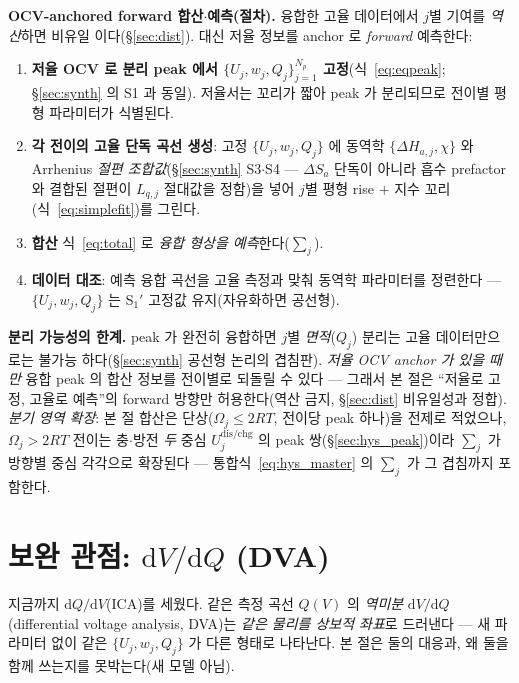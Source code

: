 \documentclass[11pt,a4paper]{article}
\newcommand{\dd}{\mathrm{d}}
\newcommand{\dis}{\mathrm{dis}}
\newcommand{\chg}{\mathrm{chg}}
\begin{document}
\textbf{OCV-anchored forward 합산$\cdot$예측(절차).} 융합한 고율 데이터에서 $j$별 기여를 \emph{역산}하면 비유일
이다(\S\ref{sec:dist}). 대신 저율 정보를 anchor 로 \emph{forward} 예측한다:
\begin{enumerate}[label=\textbf{S$_\arabic*'$.},leftmargin=2.8em,itemsep=2pt]
\item \textbf{저율 OCV 로 분리 peak 에서 $\{U_j,w_j,Q_j\}_{j=1}^{N_p}$ 고정}(식~\eqref{eq:eqpeak}; \S\ref{sec:synth}
  의 S1 과 동일). 저율서는 꼬리가 짧아 peak 가 분리되므로 전이별 평형 파라미터가 식별된다.
\item \textbf{각 전이의 고율 단독 곡선 생성}: 고정 $\{U_j,w_j,Q_j\}$ 에 동역학 $\{\Delta H_{a,j},\chi\}$ 와 Arrhenius
  \emph{절편 조합값}(\S\ref{sec:synth} S3$\cdot$S4 — $\Delta S_a$ 단독이 아니라 흡수 prefactor 와 결합된 절편이
  $L_{q,j}$ 절대값을 정함)을 넣어 $j$별 평형 rise $+$ 지수 꼬리(식~\eqref{eq:simplefit})를 그린다.
\item \textbf{합산} 식~\eqref{eq:total} 로 \emph{융합 형상을 예측}한다($\sum_j$).
\item \textbf{데이터 대조}: 예측 융합 곡선을 고율 측정과 맞춰 동역학 파라미터를 정련한다 — $\{U_j,w_j,Q_j\}$ 는
  S$_1'$ 고정값 유지(자유화하면 공선형).
\end{enumerate}
\textbf{분리 가능성의 한계.} peak 가 완전히 융합하면 $j$별 \emph{면적}($Q_j$) 분리는 고율 데이터만으로는 불가능
하다(\S\ref{sec:synth} 공선형 논리의 겹침판). \emph{저율 OCV anchor 가 있을 때만} 융합 peak 의 합산 정보를
전이별로 되돌릴 수 있다 — 그래서 본 절은 ``저율로 고정, 고율로 예측''의 forward 방향만 허용한다(역산 금지,
\S\ref{sec:dist} 비유일성과 정합). \emph{분기 영역 확장}: 본 절 합산은 단상($\Omega_j\le2RT$, 전이당 peak 하나)을
전제로 적었으나, $\Omega_j>2RT$ 전이는 충$\cdot$방전 \emph{두} 중심 $U_j^{\dis/\chg}$ 의 peak 쌍(\S\ref{sec:hys_peak})이라
$\sum_j$ 가 방향별 중심 각각으로 확장된다 — 통합식~\eqref{eq:hys_master} 의 $\sum_j$ 가 그 겹침까지 포함한다.

\section{보완 관점: $\dd V/\dd Q$ (DVA)}\label{sec:dva}
지금까지 $\dd Q/\dd V$(ICA)를 세웠다. 같은 측정 곡선 $Q(V)$ 의 \emph{역미분} $\dd V/\dd Q$(differential voltage
analysis, DVA)는 \emph{같은 물리를 상보적 좌표}로 드러낸다 — 새 파라미터 없이 같은 $\{U_j,w_j,Q_j\}$ 가 다른
형태로 나타난다. 본 절은 둘의 대응과, 왜 둘을 함께 쓰는지를 못박는다(새 모델 아님).
\end{document}
